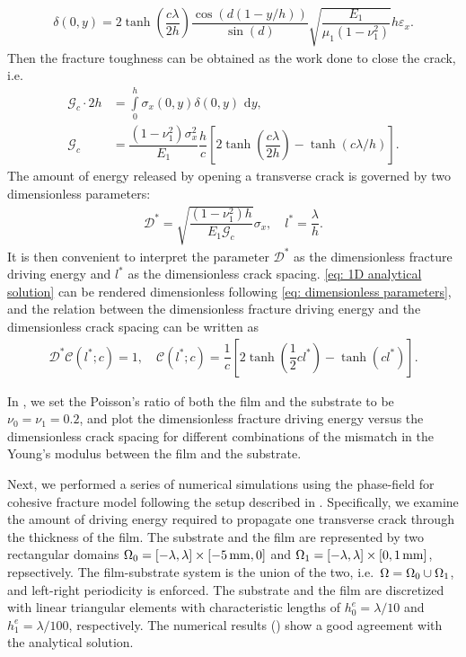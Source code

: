 \begin{align}
  \delta(0,y) = 2\tanh\left(\dfrac{c\lambda}{2h}\right)\dfrac{\cos(d(1-y/h))}{\sin(d)}\sqrt{\dfrac{E_1}{\mu_1(1-\nu_1^2)}}h\varepsilon_x .
\end{align}
Then the fracture toughness can be obtained as the work done to close the crack, i.e.
\begin{align}
  \mathcal{G}_c\cdot2h & = \int\limits_0^h \sigma_x(0,y)\delta(0,y)\text{ d}y,                                                                                                          \\
  \mathcal{G}_c        & = \dfrac{(1-\nu_1^2)\sigma_x^2}{E_1}\dfrac{h}{c}\left[ 2\tanh\left( \dfrac{c\lambda}{2h} \right)-\tanh(c\lambda/h) \right] .\label{eq: 1D analytical solution}
\end{align}
The amount of energy released by opening a transverse crack is governed by two dimensionless parameters:
\begin{align}
  \mathcal{D}^* = \sqrt{\dfrac{(1-\nu_1^2)h}{E_1\mathcal{G}_c}}\sigma_x, \quad l^* = \dfrac{\lambda}{h} \label{eq: dimensionless parameters}.
\end{align}
It is then convenient to interpret the  parameter $\mathcal{D}^*$ as the dimensionless fracture driving energy and $l^*$ as the dimensionless crack spacing. \eqref{eq: 1D analytical solution} can be rendered dimensionless following \eqref{eq: dimensionless parameters}, and the relation between the dimensionless fracture driving energy and the dimensionless crack spacing can be written as
\begin{align}
  \mathcal{D}^* \mathcal{C}(l^*;c) = 1, \quad \mathcal{C}(l^*;c) = \dfrac{1}{c}\left[ 2\tanh\left( \dfrac{1}{2} c l^* \right)-\tanh(cl^*) \right].
\end{align}



In , we set the Poisson's ratio of both the film and the substrate to be $\nu_0 = \nu_1 = 0.2$, and plot the dimensionless fracture driving energy versus the dimensionless crack spacing for different combinations of the mismatch in the Young's modulus between the film and the substrate.

Next, we performed a series of numerical simulations using the phase-field for cohesive fracture model following the setup described in .  Specifically, we examine the amount of driving energy required to propagate one transverse crack through the thickness of the film. The substrate and the film are represented by two rectangular domains $\Omega_0 = [-\lambda,\lambda] \times [\SI{-5}{\milli\meter},0]$
and $\Omega_1 = [-\lambda,\lambda] \times [0,\SI{1}{\milli\meter}]$, repsectively. The film-substrate system is the union of the two, i.e.\ $\Omega = \Omega_0 \cup \Omega_1$, and left-right periodicity is enforced. The substrate and the film are discretized with linear triangular elements with characteristic lengths of $h^e_0 = \lambda/10$ and $h^e_1 = \lambda/100$, respectively.
The numerical results () show a good agreement with the analytical solution.

